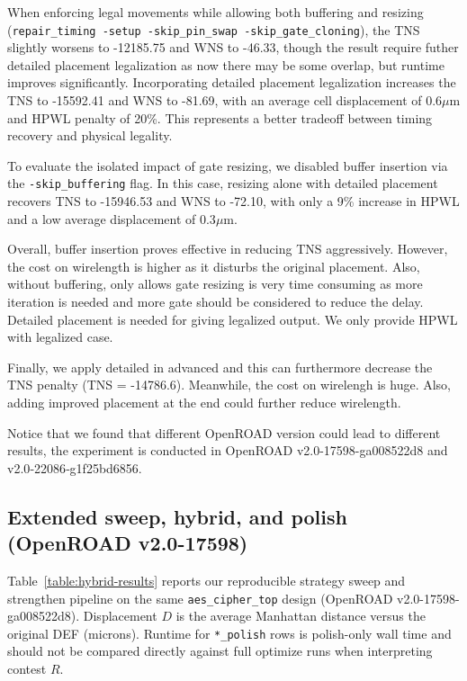 \documentclass[conference]{IEEEtran}
\begin{document}
When enforcing legal movements while allowing both buffering and resizing (\texttt{repair\_timing -setup -skip\_pin\_swap -skip\_gate\_cloning}), the TNS slightly worsens to -12185.75 and WNS to -46.33, though the result require futher detailed placement legalization as now there may be some overlap, but runtime improves significantly. Incorporating detailed placement legalization increases the TNS to -15592.41 and WNS to -81.69, with an average cell displacement of 0.6$\mu$m and HPWL penalty of 20\%. This represents a better tradeoff between timing recovery and physical legality.

To evaluate the isolated impact of gate resizing, we disabled buffer insertion via the \texttt{-skip\_buffering} flag. In this case, resizing alone with detailed placement recovers TNS to -15946.53 and WNS to -72.10, with only a 9\% increase in HPWL and a low average displacement of 0.3$\mu$m.

Overall, buffer insertion proves effective in reducing TNS aggressively. However, the cost on wirelength is higher as it disturbs the original placement. Also, without buffering, only allows gate resizing is very time consuming as more iteration is needed and more gate should be considered to reduce the delay. Detailed placement is needed for giving legalized output. We only provide HPWL with legalized case.

Finally, we apply detailed in advanced and this can furthermore decrease the TNS penalty (TNS = -14786.6). Meanwhile, the cost on wirelengh is huge. Also, adding improved placement at the end could further reduce wirelength.

Notice that we found that different OpenROAD\cite{OpenROAD} version could lead to different results, the experiment is conducted in OpenROAD\cite{OpenROAD} v2.0-17598-ga008522d8 and v2.0‑22086‑g1f25bd6856.

\subsection{Extended sweep, hybrid, and polish (OpenROAD v2.0-17598)}
Table~\ref{table:hybrid-results} reports our reproducible strategy sweep and strengthen pipeline on the same \texttt{aes\_cipher\_top} design (OpenROAD v2.0-17598-ga008522d8). Displacement $D$ is the average Manhattan distance versus the original DEF (microns). Runtime for \texttt{*_polish} rows is polish-only wall time and should not be compared directly against full optimize runs when interpreting contest $R$.
\end{document}
